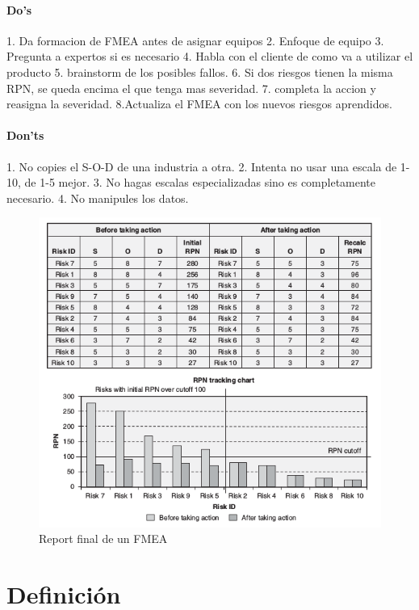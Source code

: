 \documentclass[]{article}
\begin{document}
\subsection{Do's} 1. Da formacion de FMEA antes de asignar equipos 2. Enfoque de equipo 3. Pregunta a expertos si es necesario 4. Habla con el cliente de como va a utilizar el producto 5. brainstorm de los posibles fallos. 6. Si dos riesgos tienen la misma RPN, se queda encima el que tenga mas severidad. 7. completa la accion y reasigna la severidad. 8.Actualiza el FMEA con los nuevos riesgos aprendidos.

\subsection{Don'ts} 1. No copies el S-O-D de una industria a otra. 2. Intenta no usar una escala de 1-10, de 1-5 mejor. 3. No hagas escalas especializadas sino es completamente necesario. 4.	No manipules los datos.

\begin{figure}[ht!]
	\centering
	\includegraphics[width=140mm]{imagenes/FMEAPrePos.png}
	\caption{Report final de un FMEA}
	\label{fig:FMEAPrePos}
\end{figure}
\pagebreak[4]
\part{Definición}
\end{document}
